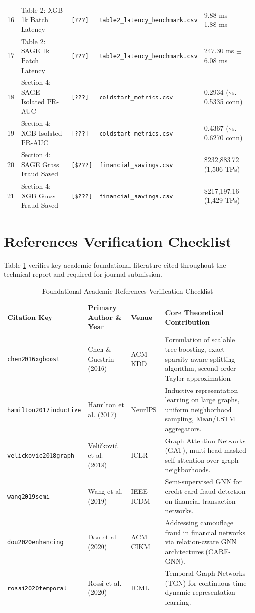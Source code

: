 \documentclass[11pt,a4paper]{report}
\begin{document}
\begin{table}[H]
\begin{tabular}{cllll}
16 & Table 2: XGB 1k Batch Latency & \texttt{[???]} & \texttt{table2\_latency\_benchmark.csv} & 9.88 ms $\pm$ 1.88 ms \\
17 & Table 2: SAGE 1k Batch Latency & \texttt{[???]} & \texttt{table2\_latency\_benchmark.csv} & 247.30 ms $\pm$ 6.08 ms \\
18 & Section 4: SAGE Isolated PR-AUC & \texttt{[???]} & \texttt{coldstart\_metrics.csv} & 0.2934 (vs. 0.5335 conn) \\
19 & Section 4: XGB Isolated PR-AUC & \texttt{[???]} & \texttt{coldstart\_metrics.csv} & 0.4367 (vs. 0.6270 conn) \\
20 & Section 4: SAGE Gross Fraud Saved & \texttt{[\$???]} & \texttt{financial\_savings.csv} & \$232,883.72 (1,506 TPs) \\
21 & Section 4: XGB Gross Fraud Saved & \texttt{[\$???]} & \texttt{financial\_savings.csv} & \$217,197.16 (1,429 TPs) \\
\bottomrule
\end{tabular}
\end{table}

\section{References Verification Checklist}
Table \ref{tab:references_checklist} verifies key academic foundational literature cited throughout the technical report and required for journal submission.

\begin{table}[H]
\centering
\caption{Foundational Academic References Verification Checklist}
\label{tab:references_checklist}
\begin{tabular}{lllp{6cm}}
\toprule
\textbf{Citation Key} & \textbf{Primary Author \& Year} & \textbf{Venue} & \textbf{Core Theoretical Contribution} \\
\midrule
\texttt{chen2016xgboost} & Chen \& Guestrin (2016) & ACM KDD & Formulation of scalable tree boosting, exact sparsity-aware splitting algorithm, second-order Taylor approximation. \\
\texttt{hamilton2017inductive} & Hamilton et al. (2017) & NeurIPS & Inductive representation learning on large graphs, uniform neighborhood sampling, Mean/LSTM aggregators. \\
\texttt{velickovic2018graph} & Veli\v{c}kovi\'{c} et al. (2018) & ICLR & Graph Attention Networks (GAT), multi-head masked self-attention over graph neighborhoods. \\
\texttt{wang2019semi} & Wang et al. (2019) & IEEE ICDM & Semi-supervised GNN for credit card fraud detection on financial transaction networks. \\
\texttt{dou2020enhancing} & Dou et al. (2020) & ACM CIKM & Addressing camouflage fraud in financial networks via relation-aware GNN architectures (CARE-GNN). \\
\texttt{rossi2020temporal} & Rossi et al. (2020) & ICML & Temporal Graph Networks (TGN) for continuous-time dynamic representation learning. \\
\bottomrule
\end{tabular}
\end{table}
\end{document}
